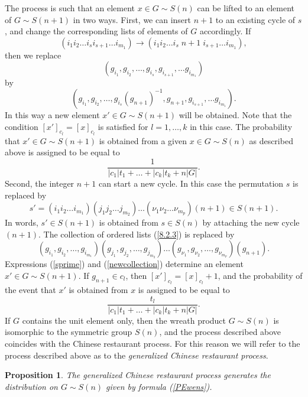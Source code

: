 \documentclass[12pt]{amsart}
\newtheorem{prop}[thm]{Proposition}
\theoremstyle{definition}
\numberwithin{equation}{section}
\begin{document}
The process is such that an element $x\in G\sim S(n)$ can be lifted to an element
of $G\sim S(n+1)$ in two ways. First, we can insert $n+1$ to an existing cycle of $s$,  and  change the corresponding lists
of elements of $G$ accordingly. If
$$
\left(i_1i_2\ldots i_si_{s+1}\ldots i_{m_1}\right)
\rightarrow\left(i_1i_2\ldots i_s\; n+1\; i_{s+1}\ldots i_{m_1}\right),
$$
then we replace
\begin{equation}\label{Element1}
\left(g_{i_1},g_{i_2},\ldots,g_{i_s},g_{i_{s+1}},\ldots g_{i_{m_1}}\right)
\end{equation}
by
\begin{equation}\label{Element2}
\left(g_{i_1},g_{i_2},\ldots,g_{i_s}\left(g_{n+1}\right)^{-1}, g_{n+1},g_{i_{s+1}},\ldots g_{i_{m_1}}\right).
\end{equation}
In this way a new element $x'\in G\sim S(n+1)$ will be obtained.
Note that the condition
 $[x']_{c_l}=[x]_{c_l}$ is satisfied for $l=1,\ldots,k$ in this case. The probability that $x'\in G\sim S(n+1)$ is obtained
 from a given $x\in G\sim S(n)$ as described above is assigned to be
 equal to
$$
\frac{1}{|c_1|t_1+\ldots+|c_k|t_k+n|G|}.
$$
Second, the integer $n+1$ can start a new cycle. In this case
the permutation $s$ is replaced by
\begin{equation}\label{sprime}
s'=\left(i_1i_2\ldots i_{m_1}\right)\left(j_1j_2\ldots j_{m_2}\right)
\ldots\left(\nu_1\nu_2\ldots \nu_{m_p}\right)(n+1)\in S(n+1).
\end{equation}
In words, $s'\in S(n+1)$ is obtained from $s\in S(n)$ by attaching the new cycle $(n+1)$. The collection of ordered lists (\ref{8.2.3}) is replaced by
\begin{equation}\label{newcollection}
\left(g_{i_1},g_{i_2},\ldots, g_{i_{m_1}}\right)\left(g_{j_1},g_{j_2},\ldots, g_{j_{m_2}}\right)
\ldots\left(g_{\nu_1},g_{\nu_2},\ldots, g_{\nu_{m_p}}\right)(g_{n+1}).
\end{equation}
Expressions (\ref{sprime}) and (\ref{newcollection}) determine an element $x'\in G\sim S(n+1)$.
If $g_{n+1}\in c_l$, then $[x']_{c_l}=[x]_{c_l}+1$, and the probability of the event that $x'$ is obtained from $x$ is assigned to be equal to
$$
\frac{t_l}{|c_1|t_1+\ldots+|c_k|t_k+n|G|}.
$$
If $G$ contains the unit element only, then the wreath product $G\sim S(n)$ is isomorphic to the symmetric group $S(n)$, and the process described above coincides with the Chinese restaurant process.  For this reason we will refer to the process described above as to the \textit{generalized
Chinese restaurant process}.
\begin{prop}
The generalized
Chinese restaurant process generates the distribution on $G\sim S(n)$ given by formula (\ref{PEwens}).
\end{prop}
\end{document}

